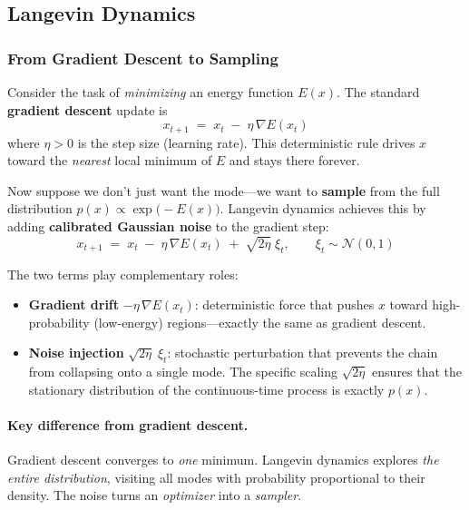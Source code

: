 \documentclass[12pt, a4paper]{article}
\begin{document}
\subsection{Langevin Dynamics}
\label{sec:langevin}

\subsubsection{From Gradient Descent to Sampling}

Consider the task of \emph{minimizing} an energy function $E(x)$.
The standard \textbf{gradient descent} update is
\begin{equation}
    x_{t+1} \;=\; x_t \;-\; \eta\,\nabla E(x_t)
    \label{eq:gd_update}
\end{equation}
where $\eta > 0$ is the step size (learning rate).  This
deterministic rule drives $x$ toward the \emph{nearest} local
minimum of $E$ and stays there forever.

Now suppose we don't just want the mode---we want to
\textbf{sample} from the full distribution
$p(x) \propto \exp\!\bigl(-E(x)\bigr)$.
Langevin dynamics achieves this by adding
\textbf{calibrated Gaussian noise} to the gradient step:
\begin{equation}
    \boxed{\;
    x_{t+1} \;=\; x_t \;-\;
    \eta\,\nabla E(x_t)
    \;+\; \sqrt{2\eta}\;\xi_t,
    \qquad \xi_t \sim \mathcal{N}(0,1)
    \;}
    \label{eq:langevin_update}
\end{equation}

The two terms play complementary roles:
\begin{itemize}
    \item \textbf{Gradient drift}
          $-\eta\,\nabla E(x_t)$:
          deterministic force that pushes $x$ toward
          high-probability (low-energy) regions---exactly
          the same as gradient descent.
    \item \textbf{Noise injection}
          $\sqrt{2\eta}\;\xi_t$:
          stochastic perturbation that prevents the chain
          from collapsing onto a single mode.  The specific
          scaling $\sqrt{2\eta}$ ensures that the stationary
          distribution of the continuous-time process is
          exactly $p(x)$.
\end{itemize}

\paragraph{Key difference from gradient descent.}
Gradient descent converges to \emph{one} minimum.
Langevin dynamics explores \emph{the entire distribution},
visiting all modes with probability proportional to their
density.  The noise turns an \emph{optimizer} into a
\emph{sampler}.
\end{document}
